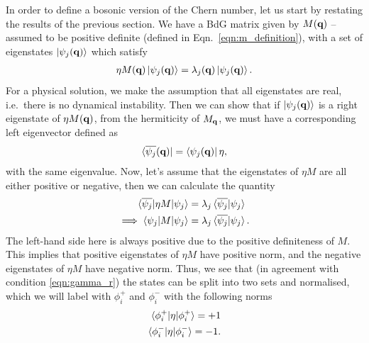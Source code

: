 In order to define a bosonic version of the Chern number, let us start by restating the results of the previous section. We have a BdG matrix given by $M(\textbf q)$ -- assumed to be positive definite (defined in Eqn.~\ref{eqn:m_definition}), with a set of eigenstates $\ket{\psi_j(\textbf q)}$ which satisfy
\begin{align}
    \eta M(\textbf q) \ket{\psi_j(\textbf q)} = 
    \lambda_j (\textbf q) \ket{\psi_j(\textbf q)}.
\end{align}
For a physical solution, we make the assumption that all eigenstates are real, i.e.~there is no dynamical instability. Then we can show that if $\ket{\psi_j(\textbf q)}$ is a right eigenstate of $\eta M(\textbf q)$, from the hermiticity of $M_{\textbf q}$, we must have a corresponding left eigenvector defined as 
\begin{align}
    \bra{\overline{\psi_j}(\textbf q)} = \bra{\psi_j(\textbf q)} \eta,
\end{align}
with the same eigenvalue. Now, let's assume that the eigenstates of $\eta M$ are all either positive or negative, then we can calculate the quantity
\begin{align}
    \braket{\overline{\psi_j} | \eta M |\psi_j} 
    &= \lambda_{j}
    \braket{\overline{\psi_j} | \psi_j} \\ 
    \implies
    \braket{\psi_j | M | \psi_j} 
    & = \lambda_{j}
    \braket{\overline{\psi_j} | \psi_j}.
\end{align}
The left-hand side here is always positive due to the positive definiteness of $M$. This implies that positive eigenstates of $\eta M$ have positive norm, and the negative eigenstates of $\eta M$ have negative norm. Thus, we see that (in agreement with condition \ref{eqn:gamma_r}) the states can be split into two sets and normalised, which we will label with $\phi_i^+$ and $\phi_i^-$ with the following norms
\begin{align}
    \braket{\phi_i^+ | \eta  |\phi_i^+} = +1 \\
    \braket{\phi_i^- | \eta  |\phi_i^-} = -1 .
\end{align} 

